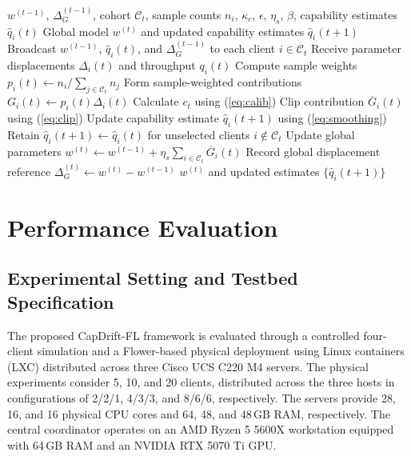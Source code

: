 \documentclass[conference]{IEEEtran}
\begin{document}
\begin{algorithm}[t]
\caption{CapDrift-FL Server Coordination}
\label{alg:server}
\begin{algorithmic}[1]
\REQUIRE $w^{(t-1)}$, $\Delta_G^{(t-1)}$, cohort $\mathcal{C}_t$, sample counts $n_i$, $\kappa_c$, $\epsilon$, $\eta_s$, $\beta$, capability estimates $\widehat q_i(t)$
\ENSURE Global model $w^{(t)}$ and updated capability estimates $\widehat q_i(t+1)$
\STATE Broadcast $w^{(t-1)}$, $\widehat q_i(t)$, and $\Delta_G^{(t-1)}$ to each client $i \in \mathcal{C}_t$
\STATE Receive parameter displacements $\Delta_i(t)$ and throughput $q_i(t)$
\STATE Compute sample weights $p_i(t) \leftarrow n_i / \sum_{j \in \mathcal{C}_t} n_j$
\STATE Form sample-weighted contributions $G_i(t) \leftarrow p_i(t) \Delta_i(t)$
\STATE Calculate $c_t$ using (\ref{eq:calib})
    \STATE Clip contribution $\overline G_i(t)$ using (\ref{eq:clip})
    \STATE Update capability estimate $\widehat q_i(t+1)$ using (\ref{eq:smoothing})
\ENDFOR
\STATE Retain $\widehat q_i(t+1) \leftarrow \widehat q_i(t)$ for unselected clients $i \notin \mathcal{C}_t$
\STATE Update global parameters $w^{(t)} \leftarrow w^{(t-1)} + \eta_s \sum_{i \in \mathcal{C}_t} \overline G_i(t)$
\STATE Record global displacement reference $\Delta_G^{(t)} \leftarrow w^{(t)} - w^{(t-1)}$
\RETURN $w^{(t)}$ and updated estimates $\{\widehat q_i(t+1)\}$
\end{algorithmic}
\end{algorithm}

\section{Performance Evaluation}
\label{sec:eval}

\subsection{Experimental Setting and Testbed Specification}
\label{subsec:testbed}

The proposed CapDrift-FL framework is evaluated through a controlled four-client simulation and a Flower-based physical deployment using Linux
containers (LXC) distributed across three Cisco UCS C220 M4 servers. The physical experiments consider 5, 10, and 20 clients, distributed
across the three hosts in configurations of 2/2/1, 4/3/3, and 8/6/6, respectively. The servers provide 28, 16, and 16 physical CPU cores and 64, 48, and 48\,GB RAM, respectively.
The central coordinator operates on an AMD Ryzen 5 5600X workstation equipped with 64\,GB RAM and an NVIDIA RTX 5070 Ti GPU.
\end{document}
